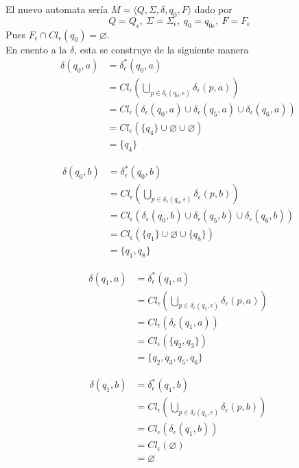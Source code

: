 \documentclass{article}
\begin{document}
\begin{enumerate}
{\begin{enumerate}
{					El nuevo automata sería $M = \langle Q, \Sigma, \delta, 
					q_{0}, F \rangle$ dado por 
					\[\ Q = Q_{\epsilon},\ \Sigma = \Sigma_{\epsilon},
					\ q_0 = q_{0\epsilon},\ F = F_{\epsilon}\]
					Pues $F_{\epsilon} \cap Cl_{\epsilon}(q_{0}) = \varnothing$.\\
					En cuento a la $\delta$, esta se construye de la siguiente 
					manera
					\begin{align*}
						\delta(q_{0}, a) &= \delta^{*}_{\epsilon}(q_{0}, a) \\
						&= Cl_{\epsilon}(\bigcup_{p \in \delta_{\epsilon}(q_{0}, \epsilon)}
						{\delta_{\epsilon}(p, a)}) \\
						&= Cl_{\epsilon}(\delta_{\epsilon}(q_{0}, a) 
						\cup \delta_{\epsilon}(q_{5}, a)
						\cup \delta_{\epsilon}(q_{6}, a))\\
						&= Cl_{\epsilon}(\{q_{4}\} \cup \varnothing \cup \varnothing)\\
						&= \{q_{4}\}
					\end{align*}

					\begin{align*}
						\delta(q_{0}, b) &= \delta^{*}_{\epsilon}(q_{0}, b) \\
						&= Cl_{\epsilon}(\bigcup_{p \in \delta_{\epsilon}(q_{0}, \epsilon)}
						{\delta_{\epsilon}(p, b)}) \\
						&= Cl_{\epsilon}(\delta_{\epsilon}(q_{0}, b) 
						\cup \delta_{\epsilon}(q_{5}, b)
						\cup \delta_{\epsilon}(q_{6}, b))\\
						&= Cl_{\epsilon}(\{q_{1}\} \cup \varnothing \cup \{q_{8}\})\\
						&= \{q_{1}, q_{8}\}
					\end{align*}

					\begin{align*}
						\delta(q_{1}, a) &= \delta^{*}_{\epsilon}(q_{1}, a) \\
						&= Cl_{\epsilon}(\bigcup_{p \in \delta_{\epsilon}(q_{1}, \epsilon)}
						{\delta_{\epsilon}(p, a)}) \\
						&= Cl_{\epsilon}(\delta_{\epsilon}(q_{1}, a))\\
						&= Cl_{\epsilon}(\{q_{2}, q_{3}\})\\
						&= \{q_{2}, q_{3}, q_{5}, q_{6}\}
					\end{align*}

					\begin{align*}
						\delta(q_{1}, b) &= \delta^{*}_{\epsilon}(q_{1}, b) \\
						&= Cl_{\epsilon}(\bigcup_{p \in \delta_{\epsilon}(q_{1}, \epsilon)}
						{\delta_{\epsilon}(p, b)}) \\
						&= Cl_{\epsilon}(\delta_{\epsilon}(q_{1}, b)) \\
						&= Cl_{\epsilon}(\varnothing) \\
						&= \varnothing
					\end{align*}

}
\end{enumerate}}
\end{enumerate}
\end{document}
